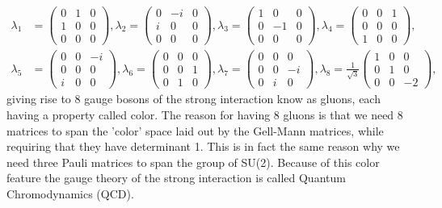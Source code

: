 \begin{align} \label{eq:gellmannmatrices}
	\lambda_1 &= \begin{pmatrix} 0 & 1 & 0 \\ 1 & 0 & 0 \\ 0 & 0 & 0 \end{pmatrix},
	\lambda_2 = \begin{pmatrix} 0 & -i & 0 \\ i & 0 & 0 \\ 0 & 0 & 0 \end{pmatrix},
	\lambda_3 = \begin{pmatrix} 1 & 0 & 0 \\ 0 & -1 & 0 \\ 0 & 0 & 0 \end{pmatrix},
	\lambda_4 = \begin{pmatrix} 0 & 0 & 1 \\ 0 & 0 & 0 \\ 1 & 0 & 0 \end{pmatrix}, \nonumber \\
	\lambda_5 &= \begin{pmatrix} 0 & 0 & -i \\ 0 & 0 & 0 \\ i & 0 & 0 \end{pmatrix},
	\lambda_6 = \begin{pmatrix} 0 & 0 & 0 \\ 0 & 0 & 1 \\ 0 & 1 & 0 \end{pmatrix},
	\lambda_7 = \begin{pmatrix} 0 & 0 & 0 \\ 0 & 0 & -i \\ 0 & i & 0 \end{pmatrix},
	\lambda_8 = \frac{1}{\sqrt{3}} \begin{pmatrix} 1 & 0 & 0 \\ 0 & 1 & 0 \\ 0 & 0 & -2 \end{pmatrix},
\end{align}
giving rise to 8 gauge bosons of the strong interaction know as gluons, each having a property called color. The reason for having 8 gluons is that we need 8 matrices to span the 'color' space laid out by the Gell-Mann matrices, while requiring that they have determinant 1. This is in fact the same reason why we need three Pauli matrices to span the group of SU(2). Because of this color feature the gauge theory of the strong interaction is called Quantum Chromodynamics (QCD).

